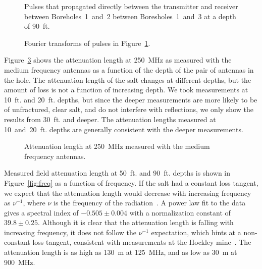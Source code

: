 \documentclass{elsart}
\begin{document}
  \begin{figure}
    \caption{Pulses that propagated directly between the transmitter and receiver between Boreholes~1~and~2 between Boresholes~1~and~3 at a depth of 90~ft.}
    \label{fig:timedomain12_13}
  \end{figure}
  
  \begin{figure}
    \caption{Fourier transforms of pulses in Figure~\ref{fig:timedomain12_13}.}
    \label{fig:freqdomain12_13}
  \end{figure}
  
  Figure~\ref{fig:depth} shows the attenuation length at 250~MHz as measured with the 
  medium frequency antennas as a function of the depth of the pair of antennas in the hole.  
  The attenuation 
  length of the salt changes at different depths, but the amount of loss is not 
  a function of increasing depth.    
  We took measurements at 10~ft. and 20~ft. depths, but since the deeper measurements 
  are more likely to be of unfractured, clear salt, and do not interfere with reflections, 
  we only show the results from 30~ft. and deeper.  
  The attenuation lengths measured at 10~and~20~ft. depths are generally consistent 
  with the deeper measurements.
  
  \begin{figure}
    \caption{Attenuation length at 250~MHz measured with the medium frequency antennas.}
    \label{fig:depth}
  \end{figure}
  
  Measured field attenuation length at 50~ft. and 90~ft. depths 
  is shown in Figure~\ref{fig:freq} as a function of 
  frequency.  If the salt had a constant loss tangent, we expect that 
  the attenuation length would decrease with 
  increasing frequency as $\nu^{-1}$, where $\nu$ is the frequency of the radiation~\cite{hockley}.    
  A power law fit to the data gives a spectral index of $-0.505\pm0.004$ with a normalization 
  constant of $39.8\pm0.25$.  Although it is clear that
  the attenuation length is falling with increasing frequency, it does not follow the $\nu^{-1}$ 
  expectation, which hints at a non-constant loss tangent, 
  consistent with measurements at the Hockley 
  mine~\cite{hockley}.  The attenuation length is as high as 130~m at 125~MHz, 
  and as low as 30~m at 900~MHz.
\end{document}
